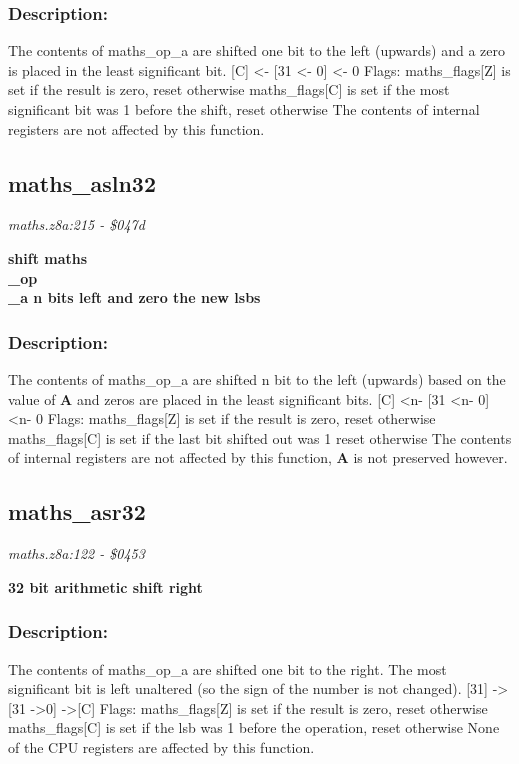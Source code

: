 \subsubsection{Description:}
 The contents of maths\_op\_a are shifted one bit to the left (upwards) and a zero is placed in the least significant bit. [C] \textless - [31 \textless - 0] \textless - 0 Flags:  maths\_flags[Z] is set if the result is zero, reset otherwise  maths\_flags[C] is set if the most significant bit was 1 before the shift,                 reset otherwise The contents of internal registers are not affected by this function.

\subsection{maths\_asln32}
\textit{maths.z8a:215 - \$047d}

\noindent
\textbf{shift maths\\\_op\\\_a n bits left and zero the new lsbs}

\subsubsection{Description:}
 The contents of maths\_op\_a are shifted n bit to the left (upwards) based on the value of \textbf{A} and zeros are placed in the least significant bits. [C] \textless n- [31 \textless n- 0] \textless n- 0 Flags:  maths\_flags[Z] is set if the result is zero, reset otherwise  maths\_flags[C] is set if the last bit shifted out was 1 reset otherwise The contents of internal registers are not affected by this function, \textbf{A} is not preserved however.

\subsection{maths\_asr32}
\textit{maths.z8a:122 - \$0453}

\noindent
\textbf{32 bit arithmetic shift right}

\subsubsection{Description:}
 The contents of maths\_op\_a are shifted one bit to the right.  The most  significant bit is left unaltered (so the sign of the number is not changed).  [31] -\textgreater  [31 -\textgreater  0] -\textgreater  [C] Flags:  maths\_flags[Z] is set if the result is zero, reset otherwise  maths\_flags[C] is set if the lsb was 1 before the operation, reset otherwise None of the CPU registers are affected by this function.

